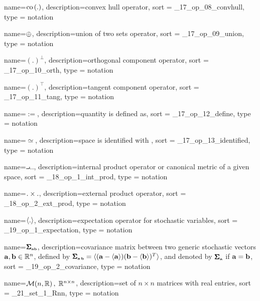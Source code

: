 {
  name={\ensuremath{\convhull{.}}},
  description={convex hull operator},
  sort = _17_op_08_convhull,
  type = notation
}

{
  name={\ensuremath{\setunion}},
  description={union of two sets operator},
  sort = _17_op_09_union,
  type = notation
}

{
  name={\ensuremath{(.)^\perp}},
  description={orthogonal component operator},
  sort = _17_op_10_orth,
  type = notation
}

{
  name={\ensuremath{(.)^\top}},
  description={tangent component operator},
  sort = _17_op_11_tang,
  type = notation
}

{
  name={\ensuremath{:=}},
  description={quantity is defined as},
  sort = _17_op_12_define,
  type = notation
}

{
  name={\ensuremath{\simeq}},
  description={space is identified with },
  sort = _17_op_13_identified,
  type = notation
}

{
  name={\ensuremath{\intprod{.}{.}}},
  description={internal product operator or canonical metric of a given space},
  sort = _18_op_1_int_prod,
  type = notation
}

{
  name={\ensuremath{\extprod{.}{.}}},
  description={external product operator},
  sort = _18_op_2_ext_prod,
  type = notation
}

{
  name={\ensuremath{\expect{.}}},
  description={expectation operator for stochastic variables},
  sort = _19_op_1_expectation,
  type = notation
}

{
  name={\ensuremath{\covar{\bvec{a}\bvec{b}}}},
  description={covariance matrix between two generic stochastic vectors 
                $\mathbf{a},\mathbf{b} \in \mathbb{R}^n$, defined by 
                $\pmb{\Sigma}_{\scriptscriptstyle \mathbf{a}\,\mathbf{b}} = \langle(\mathbf{a}-\langle\mathbf{a}\rangle)(\mathbf{b}-\langle\mathbf{b}\rangle)^T\rangle$, 
                and denoted by $\pmb{\Sigma}_{\scriptscriptstyle \mathbf{a}}$ if $\mathbf{a}=\mathbf{b}$},
  sort = _19_op_2_covariance,
  type = notation
}


{
  name={\ensuremath{\mrmn{n}\,,\; \R^{n\times n}}},
  description={set of $n \times n$ matrices with real entries},
  sort = _21_set_1_Rnn,
  type = notation
}

